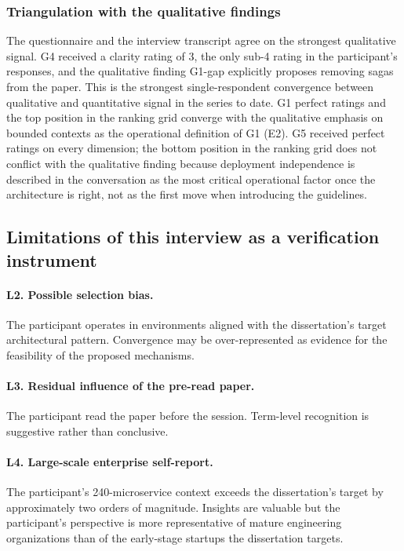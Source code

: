 \subsubsection*{Triangulation with the qualitative findings}

The questionnaire and the interview transcript agree on the strongest qualitative signal. G4 received a clarity rating of 3, the only sub-4 rating in the participant's responses, and the qualitative finding G1-gap explicitly proposes removing sagas from the paper. This is the strongest single-respondent convergence between qualitative and quantitative signal in the series to date. G1 perfect ratings and the top position in the ranking grid converge with the qualitative emphasis on bounded contexts as the operational definition of G1 (E2). G5 received perfect ratings on every dimension; the bottom position in the ranking grid does not conflict with the qualitative finding because deployment independence is described in the conversation as the most critical operational factor once the architecture is right, not as the first move when introducing the guidelines.

\subsection*{Limitations of this interview as a verification instrument}

\paragraph*{L2. Possible selection bias.} The participant operates in environments aligned with the dissertation's target architectural pattern. Convergence may be over-represented as evidence for the feasibility of the proposed mechanisms.

\paragraph*{L3. Residual influence of the pre-read paper.} The participant read the paper before the session. Term-level recognition is suggestive rather than conclusive.

\paragraph*{L4. Large-scale enterprise self-report.} The participant's 240-microservice context exceeds the dissertation's target by approximately two orders of magnitude. Insights are valuable but the participant's perspective is more representative of mature engineering organizations than of the early-stage startups the dissertation targets.


